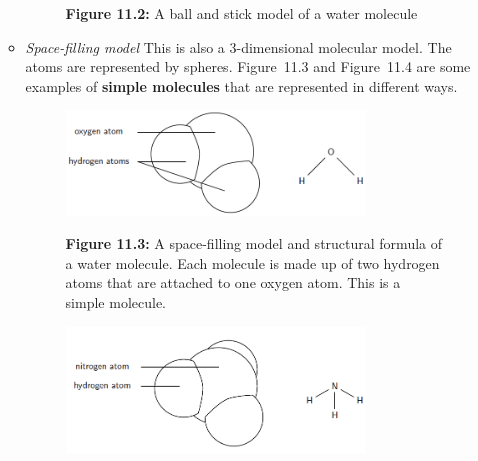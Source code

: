\begin{enumerate}[noitemsep, label=\textbf{\arabic*}. ]
\begin{itemize}[noitemsep]
\begin{figure}[H]
\begin{center}
      \vspace{2pt}
    \vspace{\rubberspace}\par \begin{cnxcaption}
	  \small \textbf{Figure 11.2: }A ball and stick model of a water 
molecule
	\end{cnxcaption}
    \vspace{.1in}
    \end{center}
 \end{figure}       \label{m38120*uid7}\item \textsl{Space-filling model}
This is also a 3-dimensional molecular model. The atoms are represented by 
spheres.
Figure~11.3 and Figure~11.4 are some examples of 
\textbf{simple molecules} that are represented in 
different ways.
    \setcounter{subfigure}{0}
	\begin{figure}[H] %
    \begin{center}
    \label{m38120*uid8!!!underscore!!!media}\label{m38120*uid8!!!underscore!!!printimage}\includegraphics[width=300px]{col11305.imgs/m38120_CG10C2_003.png} %
      \vspace{2pt}
    \vspace{\rubberspace}\par \begin{cnxcaption}
	  \small \textbf{Figure 11.3: }A space-filling model and structural 
formula of a water molecule. Each molecule is made up of two hydrogen atoms that 
are attached to one oxygen atom. This is a simple molecule.
	\end{cnxcaption}
    \vspace{.1in}
    \end{center}
 \end{figure}       
    \setcounter{subfigure}{0}
	\begin{figure}[H] %
    \begin{center}
    \label{m38120*uid9!!!underscore!!!media}\label{m38120*uid9!!!underscore!!!printimage}\includegraphics[width=300px]{col11305.imgs/m38120_CG10C2_004.png} %

\end{center}
\end{figure}
\end{itemize}
\end{enumerate}

